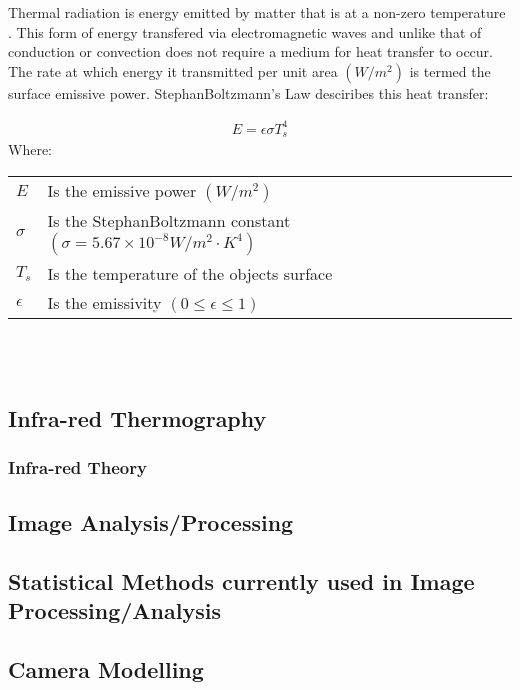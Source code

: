 \documentclass[12pt]{article}
\newcommand{\ts}{\textsuperscript}
\newcommand{\pe}{\vspace{0.3cm}}
\newcommand{\mycite}[1]{\ts{\cite{#1}}}
\begin{document}
Thermal radiation is energy emitted by matter that is at a non-zero temperature \mycite{bergman2011fundamentals}. This form of energy transfered via electromagnetic waves and unlike that of conduction or convection does not require a medium for heat transfer to occur. The rate at which energy it transmitted per unit area $(W/m^2)$ is termed the surface emissive power. StephanBoltzmann's Law desciribes this heat transfer: 
 
\begin{align} \label{StephBoltzSimp}
E = \epsilon \sigma T_s^4
\end{align} 
Where: \\ 
\begin{tabular}{l | l}
	$E$ & Is the emissive power $(W/m^2)$ \\ 
	$\sigma$ & Is the StephanBoltzmann constant $(\sigma = 5.67 \times 10^{-8} W/m^2 \cdot K^4)$ \\ 
	$T_s$ & Is the temperature of the objects surface \\   
	$\epsilon$ & Is the emissivity $(0 \leq \epsilon \leq 1)$ 
\end{tabular}
\\ \pe \\ 


\subsection{Infra-red Thermography}

\subsubsection{Infra-red Theory}

\subsection{Image Analysis/Processing}

\subsection{Statistical Methods currently used in Image Processing/Analysis} 


\subsection{Camera Modelling}
\end{document}
